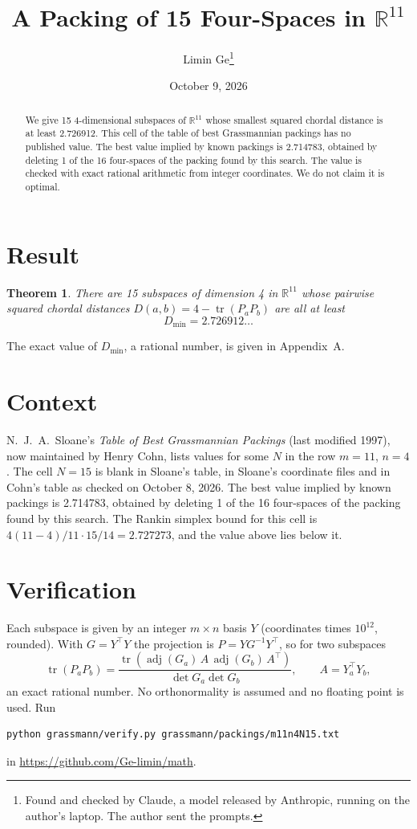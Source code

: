 \documentclass[11pt,a4paper]{article}
\title{A Packing of 15 Four-Spaces in $\mathbb{R}^{11}$}
\author{Limin Ge\thanks{Found and checked by Claude, a model released by Anthropic, running on the author's laptop. The author sent the prompts.}}
\date{October 9, 2026}
\newtheorem*{theorem}{Theorem}
\begin{document}
\maketitle
\begin{abstract}
We give 15 4-dimensional subspaces of $\mathbb{R}^{11}$ whose smallest squared chordal distance is at least 2.726912. This cell of the table of best Grassmannian packings has no published value. The best value implied by known packings is 2.714783, obtained by deleting 1 of the 16 four-spaces of the packing found by this search. The value is checked with exact rational arithmetic from integer coordinates. We do not claim it is optimal.
\end{abstract}

\section{Result}
\begin{theorem}
There are 15 subspaces of dimension 4 in $\mathbb{R}^{11}$ whose pairwise squared chordal distances $D(a,b) = 4 - \operatorname{tr}(P_aP_b)$ are all at least
\[ D_{\min} = 2.726912\ldots \]
\end{theorem}
The exact value of $D_{\min}$, a rational number, is given in Appendix~A.


\section{Context}
N.~J.~A.~Sloane's \emph{Table of Best Grassmannian Packings} (last modified 1997), now maintained by Henry Cohn, lists values for some $N$ in the row $m=11$, $n=4$. The cell $N=15$ is blank in Sloane's table, in Sloane's coordinate files and in Cohn's table as checked on October 8, 2026. The best value implied by known packings is 2.714783, obtained by deleting 1 of the 16 four-spaces of the packing found by this search. The Rankin simplex bound for this cell is $4(11-4)/11\cdot 15/14 = 2.727273$, and the value above lies below it.


\section{Verification}
Each subspace is given by an integer $m\times n$ basis $Y$ (coordinates times $10^{12}$, rounded). With $G=Y^\top Y$ the projection is $P=YG^{-1}Y^\top$, so for two subspaces
\[ \operatorname{tr}(P_aP_b)=\frac{\operatorname{tr}(\operatorname{adj}(G_a)\,A\,\operatorname{adj}(G_b)\,A^\top)}{\det G_a\det G_b},\qquad A=Y_a^\top Y_b, \]
an exact rational number. No orthonormality is assumed and no floating point is used. Run
\begin{verbatim}
python grassmann/verify.py grassmann/packings/m11n4N15.txt
\end{verbatim}
in \url{https://github.com/Ge-limin/math}.
\end{document}
